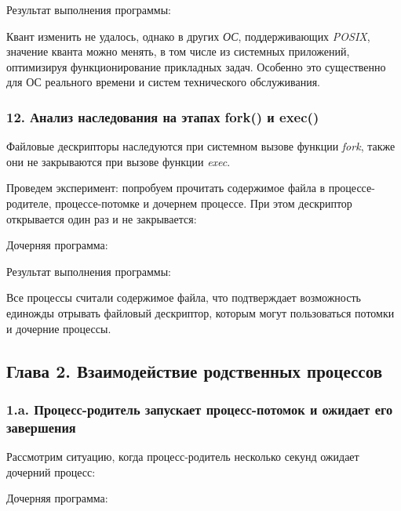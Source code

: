 \documentclass[14pt,a4paper,report]{report}
\begin{document}


Результат выполнения программы:



Квант изменить не удалось, однако в других \emph{ОС}, поддерживающих \emph{POSIX}, значение кванта можно менять, в том числе из системных приложений, оптимизируя функционирование прикладных задач. Особенно это существенно для ОС реального времени и систем технического обслуживания.

\subsubsection{12. Анализ наследования на этапах fork() и exec()}

Файловые дескрипторы наследуются при системном вызове функции \emph{fork}, также они не закрываются при вызове функции \emph{exec}.

Проведем эксперимент: попробуем прочитать содержимое файла в процессе-родителе, процессе-потомке и дочернем процессе. При этом дескриптор открывается один раз и не закрывается:



Дочерняя программа:



Результат выполнения программы:



Все процессы считали содержимое файла, что подтверждает возможность единожды отрывать файловый дескриптор, которым могут пользоваться потомки и дочерние процессы.

\subsection{Глава 2. Взаимодействие родственных процессов}

\subsubsection{1.a. Процесс-родитель запускает процесс-потомок и ожидает его завершения}

Рассмотрим ситуацию, когда процесс-родитель несколько секунд ожидает дочерний процесс:



Дочерняя программа:
\end{document}
